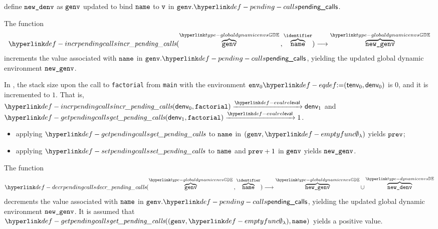 \ProseParagraph
define $\newdenv$ as $\genv$ updated to bind $\name$ to $\vv$ in $\genv.\pendingcalls$.

\FormallyParagraph
\begin{mathpar}
\end{mathpar}

\hypertarget{def-incrpendingcalls}{}
The function
\[
\incrpendingcalls(\overname{\genv}{\globaldynamicenvs} \aslsep \overname{\name}{\identifier}) \aslto
\overname{\newgenv}{\globaldynamicenvs}
\]
increments the value associated with $\name$ in $\genv.\pendingcalls$, yielding the updated global dynamic environment $\newgenv$.

In , the stack size upon the call to \verb|factorial| from \verb|main|
with the environment $\env_0 \eqdef (\tenv_0, \denv_0)$ is $0$, and it is incremented to $1$.
That is, \\
$\incrpendingcalls(\denv_0, \factorial) \evalarrow \denv_1$
and\\
$\getpendingcalls(\denv_1, \factorial) \evalarrow 1$.

\ProseParagraph
\AllApply
\begin{itemize}
  \item applying $\getpendingcalls$ to $\name$ in $(\genv, \emptyfunc)$ yields $\vprev$;
  \item applying $\setpendingcalls$ to $\name$ and $\vprev + 1$ in $\genv$ yields $\newgenv$.
\end{itemize}

\FormallyParagraph
\begin{mathpar}
\end{mathpar}

\hypertarget{def-decrpendingcalls}{}
The function
\[
\decrpendingcalls(\overname{\genv}{\globaldynamicenvs} \aslsep \overname{\name}{\identifier}) \aslto
\overname{\newgenv}{\globaldynamicenvs} \cup \overname{\newdenv}{\dynamicenvs}
\]
decrements the value associated with $\name$ in $\genv.\pendingcalls$, yielding the updated global dynamic environment $\newgenv$.
It is assumed that $\getpendingcalls((\genv, \emptyfunc), \name)$ yields a positive value.

